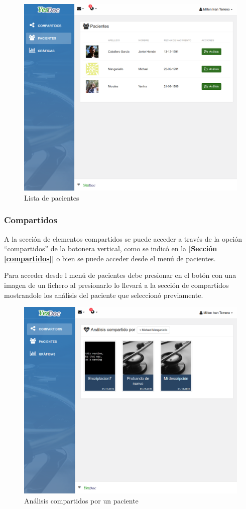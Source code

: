	\begin{figure}
		\centering
		\includegraphics[width=.8\textwidth]{img/manual_de_usuario/pacientes}
		\caption{Lista de pacientes}
		\label{pacientes}
	\end{figure}

\subsubsection{Compartidos}
A la sección de elementos compartidos se puede acceder a través de la opción ``compartidos'' de la botonera vertical, como se indicó en la \textbf{[Sección \ref{compartidos}]} o bien se puede acceder desde el menú de pacientes.


Para acceder desde l menú de pacientes debe presionar en el botón con una imagen de un fichero al presionarlo lo llevará a la sección de compartidos mostrandole los análisis del paciente que seleccionó previamente.

	\begin{figure}
		\centering
		\includegraphics[width=.8\textwidth]{img/manual_de_usuario/analisis_compartidos_medico}
		\caption{Análisis compartidos por un paciente}
		\label{analisis_compartidos_medico}
	\end{figure}

